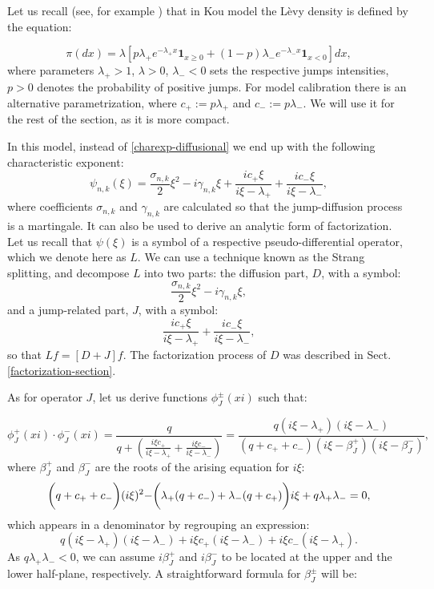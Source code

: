 \documentclass[a4paper]{jpconf}
\begin{document}
{Let us recall (see, for example \cite{itkin}) that in Kou model the L\`evy density is defined by the equation:

\begin{equation}\label{kou-model}
\pi(dx) = \lambda [p \lambda_+ e^{-\lambda_+ x} \mathbf{1}_{x \ge 0} + (1-p) \lambda_- e^{-\lambda_-x} \mathbf{1}_{x<0}]dx,
\end{equation}
where parameters $\lambda_+>1$, $\lambda>0$, $\lambda_-<0$ sets the respective jumps intensities, $p>0$ denotes the probability of positive jumps. For model calibration there is an alternative parametrization, where $c_+ := p\lambda_+$ and $c_- := p\lambda_-$. We will use it for the rest of the section, as it is more compact.

In this model, instead of \eqref{charexp-diffusional} we end up with the following characteristic exponent:
\begin{equation}\label{charexp-kou}
\psi_{n,k}(\xi) = \frac{\sigma_{n,k}}{2} \xi^2 - i\gamma_{n,k}\xi + \frac{ic_+\xi}{i\xi - \lambda_+} + \frac{ic_-\xi}{i\xi - \lambda_-},
\end{equation}
where coefficients $\sigma_{n,k}$ and $\gamma_{n,k}$ are calculated so that the jump-diffusion process is a martingale. It can also be used to derive an analytic form of factorization.
Let us recall that $\psi(\xi)$ is a symbol of a respective pseudo-differential operator, which we denote here as $L$. We can use a technique known as the Strang splitting, and decompose $L$ into two parts: the diffusion part, $D$, with a symbol:
$$\frac{\sigma_{n,k}}{2} \xi^2 - i\gamma_{n,k}\xi,$$
and a jump-related part, $J$, with a symbol:
$$\frac{ic_+\xi}{i\xi - \lambda_+} + \frac{ic_-\xi}{i\xi - \lambda_-},$$
so that $Lf = [D+J]f$. The factorization process of $D$ was described in Sect. \ref{factorization-section}. 

As for operator $J$, let us derive functions $\phi^{\pm}_J(xi)$ such that:

\begin{equation} \label{prefactorization}
\phi^+_J (xi) \cdot \phi^-_J (xi) = \frac{q}{q + (\frac{i\xi c_+}{i\xi - \lambda_+} + \frac{i\xi c_-}{i\xi - \lambda_-})} = 
\frac{q(i \xi - \lambda_+)(i\xi - \lambda_-)}{(q + c_+ + c_-)(i\xi - \beta^+_J)(i\xi - \beta^-_J)},
\end{equation}
where $\beta^+_J$ and $\beta^-_J$ are the roots of the arising equation for $i\xi$:
\begin{equation}
\biggr{(}q + c_+ + c_-\biggr{)}(i \xi)^2 - \biggr{(}\lambda_+(q + c_-) + \lambda_-(q + c_+) \biggr{)}i\xi + q \lambda_+ \lambda_- = 0,
\end{equation}
which appears in a denominator by regrouping an expression:
\begin{equation}
q(i \xi - \lambda_+)(i \xi - \lambda_-) + i\xi c_+ (i \xi - \lambda_-) + i\xi c_- (i\xi - \lambda_+).
\end{equation}
As $q \lambda_+ \lambda_- < 0$, we can assume $i\beta^+_J$ and $i\beta^-_J$ to be located at the upper and the lower half-plane, respectively. A straightforward formula for $\beta^\pm_J$ will be:

}
\end{document}

